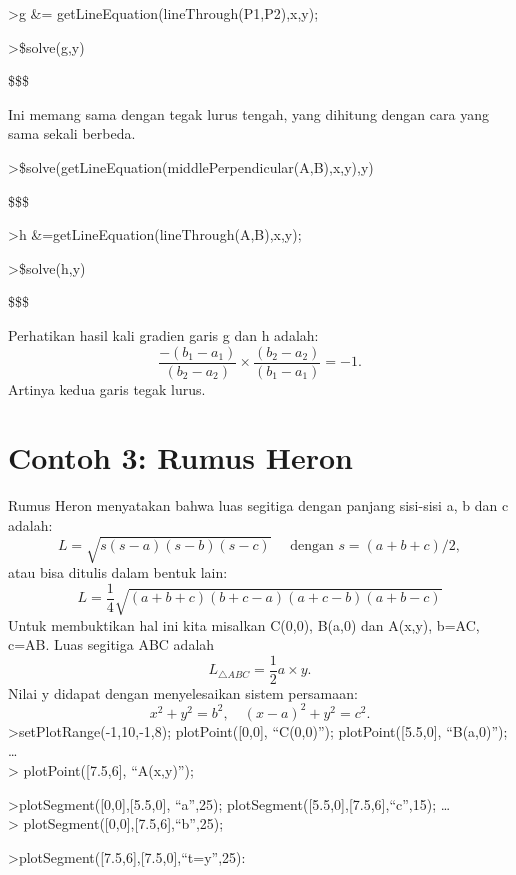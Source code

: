 \documentclass[
]{book}
\begin{document}
\textgreater g \&= getLineEquation(lineThrough(P1,P2),x,y);

\textgreater\$solve(g,y)

\$\left[ y=\frac{-\left(2\,{\it b_1}-2\,{\it a_1}\right)\,x+{\it b_2}  ^2+{\it b_1}^2-{\it a_2}^2-{\it a_1}^2}{2\,{\it b_2}-2\,{\it a_2}}   \right] \$\$

Ini memang sama dengan tegak lurus tengah, yang dihitung dengan cara yang sama sekali berbeda.

\textgreater\$solve(getLineEquation(middlePerpendicular(A,B),x,y),y)

\$\left[ y=\frac{-\left(2\,{\it b_1}-2\,{\it a_1}\right)\,x+{\it b_2}  ^2+{\it b_1}^2-{\it a_2}^2-{\it a_1}^2}{2\,{\it b_2}-2\,{\it a_2}}   \right] \$\$

\textgreater h \&=getLineEquation(lineThrough(A,B),x,y);

\textgreater\$solve(h,y)

\$\left[ y=\frac{\left({\it b_2}-{\it a_2}\right)\,x-{\it a_1}\,  {\it b_2}+{\it a_2}\,{\it b_1}}{{\it b_1}-{\it a_1}} \right] \$\$

Perhatikan hasil kali gradien garis g dan h adalah: \[\frac{-(b_1-a_1)}{(b_2-a_2)}\times \frac{(b_2-a_2)}{(b_1-a_1)} = -1.\]Artinya kedua garis tegak lurus.

\chapter{Contoh 3: Rumus Heron}\label{contoh-3-rumus-heron}

Rumus Heron menyatakan bahwa luas segitiga dengan panjang sisi-sisi a, b dan c adalah: \[L = \sqrt{s(s-a)(s-b)(s-c)}\quad \text{ dengan } s=(a+b+c)/2,\]atau bisa ditulis dalam bentuk lain: \[L = \frac{1}{4}\sqrt{(a+b+c)(b+c-a)(a+c-b)(a+b-c)}\]Untuk membuktikan hal ini kita misalkan C(0,0), B(a,0) dan A(x,y), b=AC, c=AB. Luas segitiga ABC adalah \[L_{\triangle ABC}=\frac{1}{2}a\times y.\]Nilai y didapat dengan menyelesaikan sistem persamaan: \[x^2+y^2=b^2, \quad (x-a)^2+y^2=c^2.\]\textgreater setPlotRange(-1,10,-1,8); plotPoint({[}0,0{]}, ``C(0,0)''); plotPoint({[}5.5,0{]}, ``B(a,0)''); \ldots{}\\
\textgreater{} plotPoint({[}7.5,6{]}, ``A(x,y)'');

\textgreater plotSegment({[}0,0{]},{[}5.5,0{]}, ``a'',25); plotSegment({[}5.5,0{]},{[}7.5,6{]},``c'',15); \ldots{}\\
\textgreater{} plotSegment({[}0,0{]},{[}7.5,6{]},``b'',25);

\textgreater plotSegment({[}7.5,6{]},{[}7.5,0{]},``t=y'',25):
\end{document}
